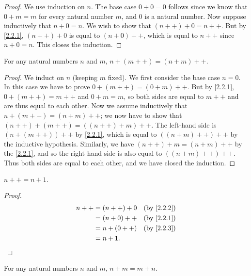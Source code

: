 \begin{proof}
  We use induction on \(n\).
  The base case \(0 + 0 = 0\) follows since we know that \(0 + m = m\) for every natural number \(m\), and \(0\) is a natural number.
  Now suppose inductively that \(n + 0 = n\).
  We wish to show that \((n++) + 0 = n++\).
  But by \cref{2.2.1}, \((n++) + 0\) is equal to \((n + 0)++\), which is equal to \(n++\) since \(n + 0 = n\).
  This closes the induction.
\end{proof}

\begin{lemma}\label{2.2.3}
  For any natural numbers \(n\) and \(m\), \(n + (m++) = (n + m)++\).
\end{lemma}

\begin{proof}
  We induct on \(n\) (keeping \(m\) fixed).
  We first consider the base case \(n = 0\).
  In this case we have to prove \(0 + (m++) = (0 + m)++\).
  But by \cref{2.2.1}, \(0 + (m++) = m++\) and \(0 + m = m\), so both sides are equal to \(m++\) and are thus equal to each other.
  Now we assume inductively that \(n + (m++) = (n + m)++\);
  we now have to show that \((n++) + (m++) = ((n++) + m)++\).
  The left-hand side is \((n + (m++))++\) by \cref{2.2.1}, which is equal to \(((n+m)++)++\) by the inductive hypothesis.
  Similarly, we have \((n++) + m = (n + m)++\) by the \cref{2.2.1}, and so the right-hand side is also equal to \(((n + m)++)++\).
  Thus both sides are equal to each other, and we have closed the induction.
\end{proof}

\begin{additional corollary}\label{ac 2.2.2}
\(n++ = n + 1\).
\end{additional corollary}

\begin{proof}
  \begin{align*}
    n++ & = (n++) + 0 & \text{(by \cref{2.2.2})} \\
        & = (n + 0)++ & \text{(by \cref{2.2.1})} \\
        & = n + (0++) & \text{(by \cref{2.2.3})} \\
        & = n + 1.
  \end{align*}
\end{proof}

\begin{proposition}\label{2.2.4}
  For any natural numbers \(n\) and \(m\), \(n + m = m + n\).
\end{proposition}

